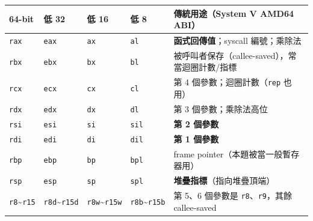 \documentclass[10pt,a4paper]{article}
\newcounter{none}
\begin{document}
{\def\LTcaptype{none} %
\begin{longtable}[]{@{}
  >{\raggedright\arraybackslash}p{}
  >{\raggedright\arraybackslash}p{}
  >{\raggedright\arraybackslash}p{}
  >{\raggedright\arraybackslash}p{}
  >{\raggedright\arraybackslash}p{}@{}}
\toprule\noalign{}
\begin{minipage}[b]{\linewidth}\raggedright
64-bit
\end{minipage} & \begin{minipage}[b]{\linewidth}\raggedright
低 32
\end{minipage} & \begin{minipage}[b]{\linewidth}\raggedright
低 16
\end{minipage} & \begin{minipage}[b]{\linewidth}\raggedright
低 8
\end{minipage} & \begin{minipage}[b]{\linewidth}\raggedright
傳統用途（System V AMD64 ABI）
\end{minipage} \\
\midrule\noalign{}
\endhead
\bottomrule\noalign{}
\endlastfoot
\texttt{rax} & \texttt{eax} & \texttt{ax} & \texttt{al} &
\textbf{函式回傳值}；syscall 編號；乘除法 \\
\texttt{rbx} & \texttt{ebx} & \texttt{bx} & \texttt{bl} &
被呼叫者保存（callee-saved），常當迴圈計數/指標 \\
\texttt{rcx} & \texttt{ecx} & \texttt{cx} & \texttt{cl} & 第 4
個參數；迴圈計數（\texttt{rep} 也用） \\
\texttt{rdx} & \texttt{edx} & \texttt{dx} & \texttt{dl} & 第 3
個參數；乘除法高位 \\
\texttt{rsi} & \texttt{esi} & \texttt{si} & \texttt{sil} & \textbf{第 2
個參數} \\
\texttt{rdi} & \texttt{edi} & \texttt{di} & \texttt{dil} & \textbf{第 1
個參數} \\
\texttt{rbp} & \texttt{ebp} & \texttt{bp} & \texttt{bpl} & frame
pointer（本題被當一般暫存器用） \\
\texttt{rsp} & \texttt{esp} & \texttt{sp} & \texttt{spl} &
\textbf{堆疊指標}（指向堆疊頂端） \\
\texttt{r8}\textasciitilde{}\texttt{r15} &
\texttt{r8d}\textasciitilde{}\texttt{r15d} &
\texttt{r8w}\textasciitilde{}\texttt{r15w} &
\texttt{r8b}\textasciitilde{}\texttt{r15b} & 第 5、6 個參數是
\texttt{r8}、\texttt{r9}，其餘 callee-saved \\
\end{longtable}
}
\end{document}
